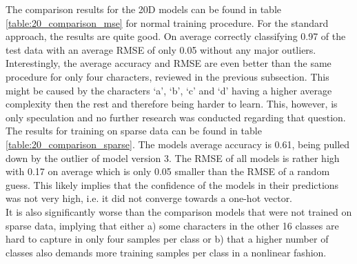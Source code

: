 The comparison results for the 20D models can be found in table \ref{table:20_comparison_mse} for normal training procedure. For the standard approach, the results are quite good. On average correctly classifying 0.97 of the test data with an average RMSE of only 0.05 without any major outliers.\\
Interestingly, the average accuracy and RMSE are even better than the same procedure for only four characters, reviewed in the previous subsection. This might be caused by the characters `a', `b', `c' and `d' having a higher average complexity then the rest and therefore being harder to learn. This, however, is only speculation and no further research was conducted regarding that question. \\
The results for training on sparse data can be found in table \ref{table:20_comparison_sparse}. The models average accuracy is 0.61, being pulled down by the outlier of model version 3. The RMSE of all models is rather high with 0.17 on average which is only 0.05 smaller than the RMSE of a random guess. This likely implies that the confidence of the models in their predictions was not very high, i.e. it did not converge towards a one-hot vector. \\
It is also significantly worse than the comparison models that were not trained on sparse data, implying that either a) some characters in the other 16 classes are hard to capture in only four samples per class or b) that a higher number of classes also demands more training samples per class in a nonlinear fashion. 


